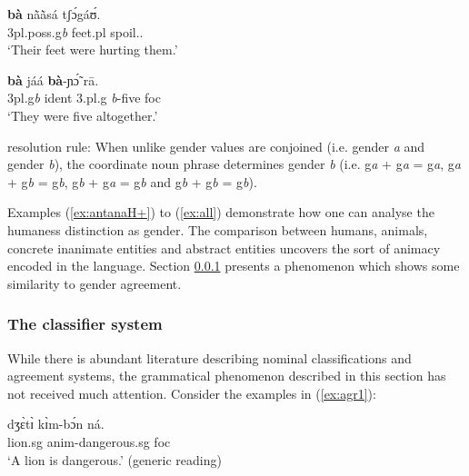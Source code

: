 \begin{exe}
\begin{exe}
\begin{exe}
\begin{exe}
\begin{exe}
\begin{exe}
\begin{exe}
\begin{exe}
\begin{exe}
\begin{exe}
\begin{exe}
\ex\label{ex:Tamposs}

\gll  \textbf{bà}  nã̀ã̀sá  tʃɔ́gáʊ́.\\
  {{\sc 3pl.poss.g}{\it b}}  {feet.{\sc pl}}  spoil.{\pfv}.{\foc}\\
\glt `Their feet were hurting them.'\\

\ex\label{ex:Tamnum}

\gll   \textbf{bà}  jáá \textbf{bà}-ɲɔ̃́  rā.\\
  {{\sc 3pl.g}{\it b}} {\sc ident}
{3.{\sc pl}.{\sc g}{\it
b}-five} {\sc foc}\\
\glt `They were five altogether.'\\

\ex\label{ex:rule}

{\sc resolution rule}: {\rm When unlike gender values are conjoined
(i.e. {\sc gender} {\it  a} and {\sc gender} {\it b}), the
coordinate noun phrase determines {\sc gender} {\it b} (i.e.
{\sc g}{\it a} + {\sc g}{\it a} = {\sc g}{\it a},
{\sc g}{\it a} + {\sc g}{\it b} = {\sc g}{\it b},
{\sc g}{\it b} + {\sc g}{\it a} = {\sc g}{\it b} and
{\sc g}{\it b} + {\sc g}{\it b} = {\sc g}{\it b}).}

\z 
 \z
 
Examples (\ref{ex:antanaH+}) to (\ref{ex:all}) demonstrate how one can analyse the humaness distinction as gender. The comparison between humans, animals, concrete inanimate entities and abstract entities uncovers the sort of animacy encoded in the language. Section \ref{sec:classifier}  presents a phenomenon which shows some similarity to gender agreement.

\subsubsection{The classifier system}
\label{sec:classifier}

While there is abundant  literature describing  nominal classifications and agreement systems, the grammatical phenomenon  described in this section  has not received much attention.  Consider the examples in (\ref{ex:agr1}):   

\ea\label{ex:agr1}

\ea\label{ex:agrA}
\gll  dʒɛ̀tɪ̀ kɪ̀m-bɔ́n  ná.\\
  lion.{\sc sg}  {\sc anim}-dangerous.{\sc sg}  {\sc foc}\\
\glt  `A lion is {\sc dangerous}.' (generic reading) 




\end{exe}
\end{exe}
\end{exe}
\end{exe}
\end{exe}
\end{exe}
\end{exe}
\end{exe}
\end{exe}
\end{exe}
\end{exe}

